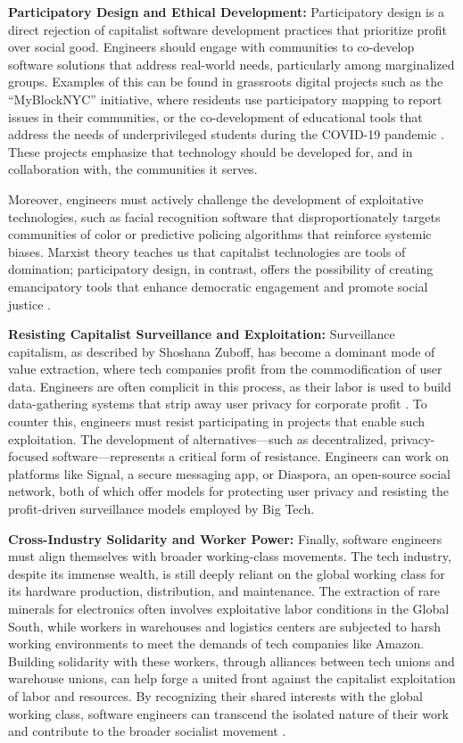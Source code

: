 \begin{refsection}
\textbf{Participatory Design and Ethical Development:} 
Participatory design is a direct rejection of capitalist software development practices that prioritize profit over social good. Engineers should engage with communities to co-develop software solutions that address real-world needs, particularly among marginalized groups. Examples of this can be found in grassroots digital projects such as the “MyBlockNYC” initiative, where residents use participatory mapping to report issues in their communities, or the co-development of educational tools that address the needs of underprivileged students during the COVID-19 pandemic \cite[pp.~65-67]{noble2018}. These projects emphasize that technology should be developed for, and in collaboration with, the communities it serves.

Moreover, engineers must actively challenge the development of exploitative technologies, such as facial recognition software that disproportionately targets communities of color or predictive policing algorithms that reinforce systemic biases. Marxist theory teaches us that capitalist technologies are tools of domination; participatory design, in contrast, offers the possibility of creating emancipatory tools that enhance democratic engagement and promote social justice \cite[pp.~134-136]{moody2017}.

\textbf{Resisting Capitalist Surveillance and Exploitation:}
Surveillance capitalism, as described by Shoshana Zuboff, has become a dominant mode of value extraction, where tech companies profit from the commodification of user data. Engineers are often complicit in this process, as their labor is used to build data-gathering systems that strip away user privacy for corporate profit \cite[pp.~120-123]{zuboff2020}. To counter this, engineers must resist participating in projects that enable such exploitation. The development of alternatives—such as decentralized, privacy-focused software—represents a critical form of resistance. Engineers can work on platforms like Signal, a secure messaging app, or Diaspora, an open-source social network, both of which offer models for protecting user privacy and resisting the profit-driven surveillance models employed by Big Tech.

\textbf{Cross-Industry Solidarity and Worker Power:}
Finally, software engineers must align themselves with broader working-class movements. The tech industry, despite its immense wealth, is still deeply reliant on the global working class for its hardware production, distribution, and maintenance. The extraction of rare minerals for electronics often involves exploitative labor conditions in the Global South, while workers in warehouses and logistics centers are subjected to harsh working environments to meet the demands of tech companies like Amazon. Building solidarity with these workers, through alliances between tech unions and warehouse unions, can help forge a united front against the capitalist exploitation of labor and resources. By recognizing their shared interests with the global working class, software engineers can transcend the isolated nature of their work and contribute to the broader socialist movement \cite[pp.~193-196]{scholz2017}.


\end{refsection}
